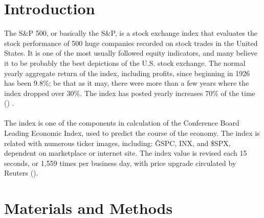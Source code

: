 \documentclass[12pt]{article}
\begin{document}
\section{Introduction}
The S\&P 500, or basically the S\&P, is a stock exchange index that evaluates the stock performance of 500 huge companies recorded on stock trades in the United States. It is one of the most usually followed equity indicators, and many believe it to be probably the best depictions of the U.S. stock exchange. The normal yearly aggregate return of the index, including profits, since beginning in 1926 has been 9.8\%; be that as it may, there were more than a few years where the index dropped over 30\%. The index has posted yearly increases 70\% of the time (\cite{ref-wiki}) .\\\\
The index is one of the components in calculation of the Conference Board Leading Economic Index, used to predict the course of the economy. The index is related with numerous ticker images, including: \^GSPC, INX, and \$SPX, dependent on marketplace or internet site. The index value is revised each 15 seconds, or 1,559 times per business day, with price upgrade circulated by Reuters (\cite{ref-quote}).


\section{Materials and Methods}
\end{document}
